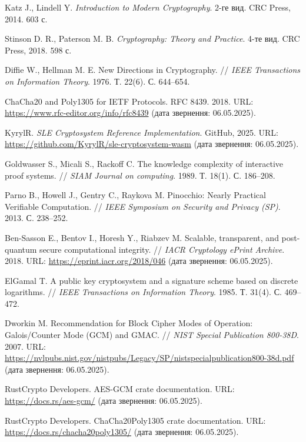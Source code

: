 \begin{thebibliography}{XX}
    Katz J., Lindell Y. \textit{Introduction to Modern Cryptography}. 2-ге вид. CRC Press, 2014. 603 с.

    Stinson D. R., Paterson M. B. \textit{Cryptography: Theory and Practice}. 4-те вид. CRC Press, 2018. 598 с.

    Diffie W., Hellman M. E. New Directions in Cryptography. // \textit{IEEE Transactions on Information Theory}. 1976. Т. 22(6). С. 644--654.

    ChaCha20 and Poly1305 for IETF Protocols. RFC 8439. 2018. URL: \url{https://www.rfc-editor.org/info/rfc8439} (дата звернення: 06.05.2025).

    KyrylR. \textit{SLE Cryptosystem Reference Implementation}. GitHub, 2025. URL: \url{https://github.com/KyrylR/sle-cryptosystem-wasm} (дата звернення: 06.05.2025).

    Goldwasser S., Micali S., Rackoff C. The knowledge complexity of interactive proof systems. // \textit{SIAM Journal on computing}. 1989. Т. 18(1). С. 186--208.

    Parno B., Howell J., Gentry C., Raykova M. Pinocchio: Nearly Practical Verifiable Computation. // \textit{IEEE Symposium on Security and Privacy (SP)}. 2013. С. 238--252.

    Ben-Sasson E., Bentov I., Horesh Y., Riabzev M. Scalable, transparent, and post-quantum secure computational integrity. // \textit{IACR Cryptology ePrint Archive}. 2018. URL: \url{https://eprint.iacr.org/2018/046} (дата звернення: 06.05.2025).

    ElGamal T. A public key cryptosystem and a signature scheme based on discrete logarithms. // \textit{IEEE Transactions on Information Theory}. 1985. Т. 31(4). С. 469--472.

    Dworkin M. Recommendation for Block Cipher Modes of Operation: Galois/Counter Mode (GCM) and GMAC. // \textit{NIST Special Publication 800-38D}. 2007. URL: \url{https://nvlpubs.nist.gov/nistpubs/Legacy/SP/nistspecialpublication800-38d.pdf} (дата звернення: 06.05.2025).

    RustCrypto Developers. AES-GCM crate documentation. URL: \url{https://docs.rs/aes-gcm/} (дата звернення: 06.05.2025).

    RustCrypto Developers. ChaCha20Poly1305 crate documentation. URL: \url{https://docs.rs/chacha20poly1305/} (дата звернення: 06.05.2025).

\end{thebibliography}
